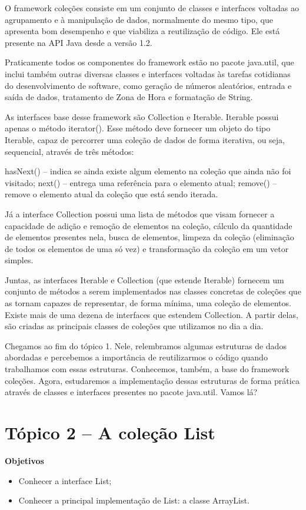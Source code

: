 \documentclass[11pt]{article}
\begin{document}
O framework coleções consiste em um conjunto de classes e interfaces voltadas ao agrupamento e à manipulação de dados, normalmente do mesmo tipo, que apresenta bom desempenho e que viabiliza a reutilização de código. Ele está presente na API Java desde a versão 1.2.

Praticamente todos os componentes do framework estão no pacote java.util, que inclui também outras diversas classes e interfaces voltadas às tarefas cotidianas do desenvolvimento de software, como geração de números aleatórios, entrada e saída de dados, tratamento de Zona de Hora e formatação de String.

As interfaces base desse framework são Collection e Iterable. Iterable possui apenas o método iterator(). Esse método deve fornecer um objeto do tipo Iterable, capaz de percorrer uma coleção de dados de forma iterativa, ou seja, sequencial, através de três métodos:

hasNext() – indica se ainda existe algum elemento na coleção que ainda não foi visitado;
next() – entrega uma referência para o elemento atual;
remove() – remove o elemento atual da coleção que está sendo iterada.

Já a interface Collection possui uma lista de métodos que visam fornecer a capacidade de adição e remoção de elementos na coleção, cálculo da quantidade de elementos presentes nela, busca de elementos, limpeza da coleção (eliminação de todos os elementos de uma só vez) e transformação da coleção em um vetor simples.

Juntas, as interfaces Iterable e Collection (que estende Iterable) fornecem um conjunto de métodos a serem implementados nas classes concretas de coleções que as tornam capazes de representar, de forma mínima, uma coleção de elementos. Existe mais de uma dezena de interfaces que estendem Collection. A partir delas, são criadas as principais classes de coleções que utilizamos no dia a dia.

Chegamos ao fim do tópico 1. Nele, relembramos algumas estruturas de dados abordadas e percebemos a importância de reutilizarmos o código quando trabalhamos com essas estruturas. Conhecemos, também, a base do framework coleções. Agora, estudaremos a implementação dessas estruturas de forma prática através de classes e interfaces presentes no pacote java.util. Vamos lá?

\section{Tópico 2 – A coleção List}
\label{sec:orge8edf71}
\textbf{Objetivos}
\begin{itemize}
\item Conhecer a interface List;
\item Conhecer a principal implementação de List: a classe ArrayList.
\end{itemize}
\end{document}
